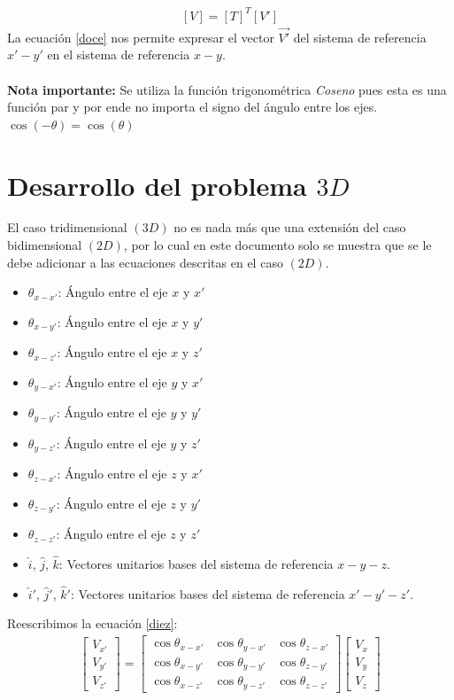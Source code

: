 \documentclass[12pt,letterpaper]{article}
\begin{document}
%
\begin{align}
	\left[ V \right] = \left[ T \right]^T \left[ V' \right] \label{doce}
\end{align}
%
La ecuación \ref{doce} nos permite expresar el vector $\overset{\rightarrow}{V'}$ del sistema de referencia $x'-y'$ en el sistema de referencia $x-y$.\\\\
%
{\bf Nota importante: } Se utiliza la función trigonométrica {\it{Coseno}} pues esta es una función par y por ende no importa el signo del ángulo entre los ejes.\\
$\cos \left( -\theta \right) = \cos \left( \theta \right)$
%
%
\section{Desarrollo del problema $3D$}
%
El caso tridimensional $(3D)$ no es nada más que una extensión del caso bidimensional $(2D)$, por lo cual en este documento solo se muestra que se le debe adicionar a las ecuaciones descritas en el caso $(2D)$.
%
\begin{itemize}
	\item $\theta_{x-x'}$: Ángulo entre el eje $x$ y $x'$
	\item $\theta_{x-y'}$: Ángulo entre el eje $x$ y $y'$
	\item $\theta_{x-z'}$: Ángulo entre el eje $x$ y $z'$
	\item $\theta_{y-x'}$: Ángulo entre el eje $y$ y $x'$
	\item $\theta_{y-y'}$: Ángulo entre el eje $y$ y $y'$
	\item $\theta_{y-z'}$: Ángulo entre el eje $y$ y $z'$
	\item $\theta_{z-x'}$: Ángulo entre el eje $z$ y $x'$
	\item $\theta_{z-y'}$: Ángulo entre el eje $z$ y $y'$
	\item $\theta_{z-z'}$: Ángulo entre el eje $z$ y $z'$
	\item $\hat{i}$, $\hat{j}$, $\hat{k}$: Vectores unitarios bases del sistema de referencia $x-y-z$.
	\item $\hat{i}'$, $\hat{j}'$, $\hat{k}'$: Vectores unitarios bases del sistema de referencia $x'-y'-z'$.
\end{itemize}
%
Reescribimos la ecuación \ref{diez}:
%
\begin{eqnarray}
		\left[ \begin{array}{c} V_{x'} \\
		V_{y'} \\ V_{z'} \end{array} \right] = 
		\left[ \begin{array}{ccc}
		\cos \theta_{x-x'} & \cos \theta_{y-x'} & \cos \theta_{z-x'} \\  
		\cos \theta_{x-y'} & \cos \theta_{y-y'} & \cos \theta_{z-y'} \\
		\cos \theta_{x-z'} & \cos \theta_{y-z'} & \cos \theta_{z-z'}
		\end{array}  \right] 
		\left[ \begin{array}{c} V_{x} \\
		V_{y} \\ V_{z} \end{array} \right]
		\label{trece}
\end{eqnarray}
\end{document}
